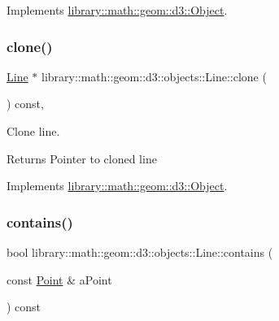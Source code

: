 Implements \hyperlink{classlibrary_1_1math_1_1geom_1_1d3_1_1_object_a5fc47b1ee5d9a28efc6010d3d1512470}{library\+::math\+::geom\+::d3\+::\+Object}.

\mbox{\label{classlibrary_1_1math_1_1geom_1_1d3_1_1objects_1_1_line_a55382b24007bccdae721176d0f73536f}} 
\subsubsection{\texorpdfstring{clone()}{clone()}}
{\footnotesize\ttfamily \hyperlink{classlibrary_1_1math_1_1geom_1_1d3_1_1objects_1_1_line}{Line} $\ast$ library\+::math\+::geom\+::d3\+::objects\+::\+Line\+::clone (\begin{DoxyParamCaption}{ }\end{DoxyParamCaption}) const\hspace{0.3cm}{\ttfamily [override]}, {\ttfamily [virtual]}}



Clone line. 

\begin{DoxyReturn}{Returns}
Pointer to cloned line 
\end{DoxyReturn}


Implements \hyperlink{classlibrary_1_1math_1_1geom_1_1d3_1_1_object_a1a784c6b359e0eb97cd34fabc42f2f3f}{library\+::math\+::geom\+::d3\+::\+Object}.

\mbox{\label{classlibrary_1_1math_1_1geom_1_1d3_1_1objects_1_1_line_a59b72a3a39134963f5165a03829b17aa}} 
\subsubsection{\texorpdfstring{contains()}{contains()}}
{\footnotesize\ttfamily bool library\+::math\+::geom\+::d3\+::objects\+::\+Line\+::contains (\begin{DoxyParamCaption}\item[{const \hyperlink{classlibrary_1_1math_1_1geom_1_1d3_1_1objects_1_1_point}{Point} \&}]{a\+Point }\end{DoxyParamCaption}) const}



